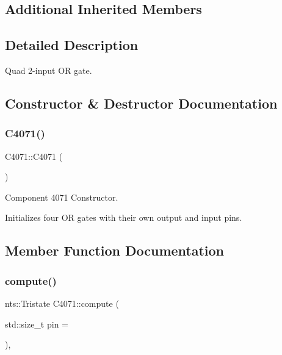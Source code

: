 \subsection*{Additional Inherited Members}


\subsection{Detailed Description}
Quad 2-\/input OR gate. 

\subsection{Constructor \& Destructor Documentation}
\mbox{\label{classC4071_ac33d5f23fd2f325b4e67c1107971e8d5}} 
\subsubsection{\texorpdfstring{C4071()}{C4071()}}
{\footnotesize\ttfamily C4071\+::\+C4071 (\begin{DoxyParamCaption}{ }\end{DoxyParamCaption})}



Component 4071 Constructor. 

Initializes four OR gates with their own output and input pins. 

\subsection{Member Function Documentation}
\mbox{\label{classC4071_af027f99834e11ebf7eed3140b25011b7}} 
\subsubsection{\texorpdfstring{compute()}{compute()}}
{\footnotesize\ttfamily nts\+::\+Tristate C4071\+::compute (\begin{DoxyParamCaption}\item[{std\+::size\+\_\+t}]{pin = {} }\end{DoxyParamCaption})\hspace{0.3cm}{\ttfamily [override]}, {\ttfamily [virtual]}}



